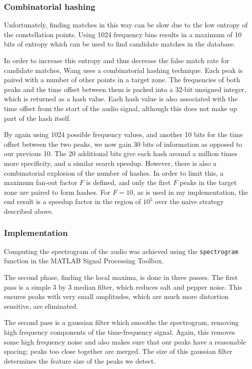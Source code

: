 \documentclass[12pt,a4paper,twoside,openright]{report}
\begin{document}
\subsubsection{Combinatorial hashing}

Unfortunately, finding matches in this way can be slow due to the low entropy of the constellation points. Using 1024 frequency bins results in a maximum of 10 bits of entropy which can be used to find candidate matches in the database. 

In order to increase this entropy and thus decrease the false match rate for candidate matches, Wang uses a combinatorial hashing technique. Each peak is paired with a number of other points in a target zone. The frequencies of both peaks and the time offset between them is packed into a 32-bit unsigned integer, which is returned as a hash value. Each hash value is also associated with the time offset from the start of the audio signal, although this does not make up part of the hash itself.

By again using 1024 possible frequency values, and another 10 bits for the time offset between the two peaks, we now gain 30 bits of information as opposed to our previous 10. The 20 additional bits give each hash around a million times more specificity, and a similar search speedup. However, there is also a combinatorial explosion of the number of hashes. In order to limit this, a maximum fan-out factor $F$ is defined, and only the first $F$ peaks in the target zone are paired to form hashes. For $F=10$, as is used in my implementation, the end result is a speedup factor in the region of $10^5$ over the na{\"i}ve strategy described above.

\subsubsection{Implementation}

Computing the spectrogram of the audio was achieved using the \lstinline{spectrogram} function in the MATLAB Signal Processing Toolbox.

The second phase, finding the local maxima, is done in three passes. The first pass is a simple 3 by 3 median filter, which reduces salt and pepper noise. This ensures peaks with very small amplitudes, which are much more distortion sensitive, are eliminated. 

The second pass is a gaussian filter which smooths the spectrogram, removing high frequency components of the time-frequency signal. Again, this removes some high frequency noise and also makes sure that our peaks have a reasonable spacing; peaks too close together are merged. The size of this gaussian filter determines the feature size of the peaks we detect. 
\end{document}
